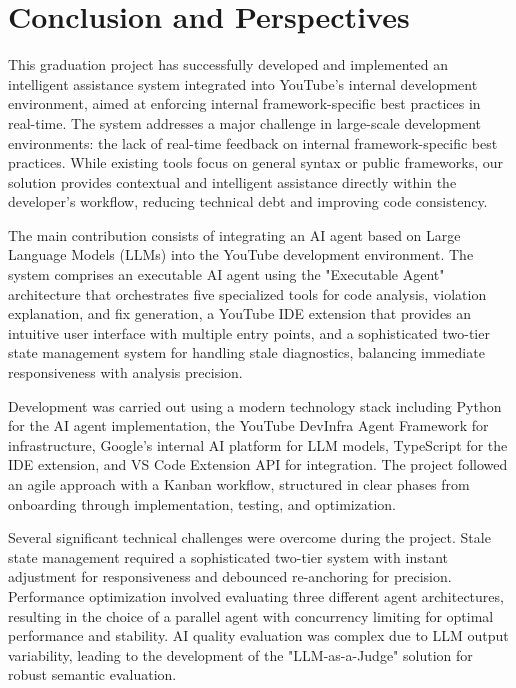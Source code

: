 \chapter{Conclusion and Perspectives}
\pagestyle{fancy}
\fancyhf{}
\fancyhead[R]{\bfseries\rightmark}
\fancyfoot[R]{\thepage}
\renewcommand{\headrulewidth}{0.5pt}
\renewcommand{\footrulewidth}{0pt}
\renewcommand{\chaptermark}[1]{\markboth{\MakeUppercase{\chaptername~\thechapter. #1 }}{}}
\renewcommand{\sectionmark}[1]{\markright{\thechapter.\thesection~ #1}}

\begin{spacing}{1.2}

This graduation project has successfully developed and implemented an intelligent assistance system integrated into YouTube's internal development environment, aimed at enforcing internal framework-specific best practices in real-time. The system addresses a major challenge in large-scale development environments: the lack of real-time feedback on internal framework-specific best practices. While existing tools focus on general syntax or public frameworks, our solution provides contextual and intelligent assistance directly within the developer's workflow, reducing technical debt and improving code consistency.

The main contribution consists of integrating an AI agent based on Large Language Models (LLMs) into the YouTube development environment. The system comprises an executable AI agent using the "Executable Agent" architecture that orchestrates five specialized tools for code analysis, violation explanation, and fix generation, a YouTube IDE extension that provides an intuitive user interface with multiple entry points, and a sophisticated two-tier state management system for handling stale diagnostics, balancing immediate responsiveness with analysis precision.

Development was carried out using a modern technology stack including Python for the AI agent implementation, the YouTube DevInfra Agent Framework for infrastructure, Google's internal AI platform for LLM models, TypeScript for the IDE extension, and VS Code Extension API for integration. The project followed an agile approach with a Kanban workflow, structured in clear phases from onboarding through implementation, testing, and optimization.

Several significant technical challenges were overcome during the project. Stale state management required a sophisticated two-tier system with instant adjustment for responsiveness and debounced re-anchoring for precision. Performance optimization involved evaluating three different agent architectures, resulting in the choice of a parallel agent with concurrency limiting for optimal performance and stability. AI quality evaluation was complex due to LLM output variability, leading to the development of the "LLM-as-a-Judge" solution for robust semantic evaluation.


\end{spacing}

